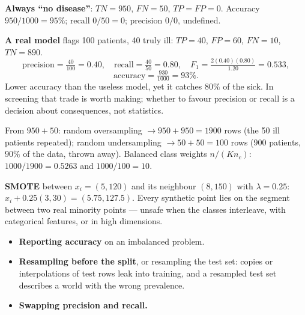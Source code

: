 \documentclass[11pt]{article}
\begin{document}
\begin{worked}
\textbf{Always ``no disease''}: $TN = 950$, $FN = 50$, $TP = FP = 0$. Accuracy
$950/1000 = 95\%$; recall $0/50 = 0$; precision $0/0$, undefined.

\textbf{A real model} flags 100 patients, 40 truly ill: $TP = 40$, $FP = 60$,
$FN = 10$, $TN = 890$.
\[
  \text{precision} = \tfrac{40}{100} = 0.40, \quad
  \text{recall} = \tfrac{40}{50} = 0.80, \quad
  F_1 = \tfrac{2(0.40)(0.80)}{1.20} = 0.533,
\]
\[
  \text{accuracy} = \tfrac{930}{1000} = 93\% .
\]
Lower accuracy than the useless model, yet it catches $80\%$ of the sick. In
screening that trade is worth making; whether to favour precision or recall
is a decision about consequences, not statistics.
\end{worked}

\begin{worked}
From $950 + 50$: random oversampling $\to 950 + 950 = 1900$ rows (the 50 ill
patients repeated); random undersampling $\to 50 + 50 = 100$ rows ($900$
patients, $90\%$ of the data, thrown away). Balanced class weights
$n/(K n_c)$: $1000/1900 = 0.5263$ and $1000/100 = 10$.

\textbf{SMOTE} between $x_i = (5, 120)$ and its neighbour $(8, 150)$ with
$\lambda = 0.25$: $x_i + 0.25(3, 30) = (5.75, 127.5)$. Every synthetic point
lies on the segment between two real minority points --- unsafe when the
classes interleave, with categorical features, or in high dimensions.
\end{worked}

\begin{caution}
\begin{itemize}
  \item \textbf{Reporting accuracy} on an imbalanced problem.
  \item \textbf{Resampling before the split}, or resampling the test set:
    copies or interpolations of test rows leak into training, and a resampled
    test set describes a world with the wrong prevalence.
  \item \textbf{Swapping precision and recall.}
\end{itemize}
\end{caution}
\end{document}
